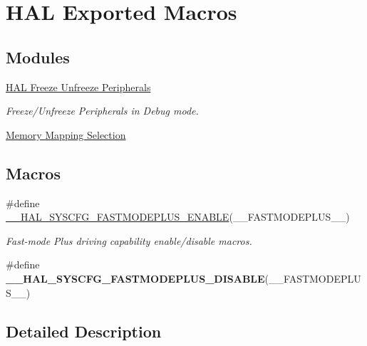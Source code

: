 \hypertarget{group___h_a_l___exported___macros}{}\section{H\+AL Exported Macros}
\label{group___h_a_l___exported___macros}
\subsection*{Modules}
\begin{DoxyCompactItemize}
\item 
\hyperlink{group___h_a_l___freeze___unfreeze___peripherals}{H\+A\+L Freeze Unfreeze Peripherals}
\begin{DoxyCompactList}\small\item\em Freeze/\+Unfreeze Peripherals in Debug mode. \end{DoxyCompactList}\item 
\hyperlink{group___memory___mapping___selection}{Memory Mapping Selection}
\end{DoxyCompactItemize}
\subsection*{Macros}
\begin{DoxyCompactItemize}
\item 
\#define \hyperlink{group___h_a_l___exported___macros_ga61181f4b4955f17858475485f8cd366c}{\+\_\+\+\_\+\+H\+A\+L\+\_\+\+S\+Y\+S\+C\+F\+G\+\_\+\+F\+A\+S\+T\+M\+O\+D\+E\+P\+L\+U\+S\+\_\+\+E\+N\+A\+B\+LE}(\+\_\+\+\_\+\+F\+A\+S\+T\+M\+O\+D\+E\+P\+L\+U\+S\+\_\+\+\_\+)
\begin{DoxyCompactList}\small\item\em Fast-\/mode Plus driving capability enable/disable macros. \end{DoxyCompactList}\item 
\#define {\bfseries \+\_\+\+\_\+\+H\+A\+L\+\_\+\+S\+Y\+S\+C\+F\+G\+\_\+\+F\+A\+S\+T\+M\+O\+D\+E\+P\+L\+U\+S\+\_\+\+D\+I\+S\+A\+B\+LE}(\+\_\+\+\_\+\+F\+A\+S\+T\+M\+O\+D\+E\+P\+L\+U\+S\+\_\+\+\_\+)
\end{DoxyCompactItemize}


\subsection{Detailed Description}


